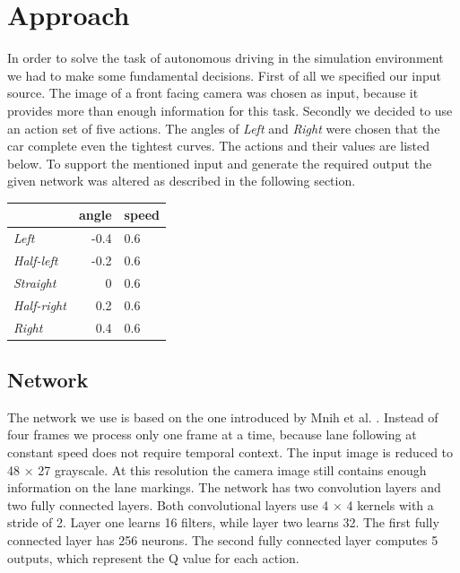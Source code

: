 
\section{Approach}\label{sec:approach}

In order to solve the task of autonomous driving in the simulation environment we had to make some fundamental decisions. First of all we specified our input source. The image of a front facing camera was chosen as input, because it provides more than enough information for this task. Secondly we decided to use an action set of five actions. The angles of \textit{Left} and \textit{Right} were chosen that the car complete even the tightest curves. The actions and their values are listed below. To support the mentioned input and generate the required output the given network was altered as described in the following section.
\begin{center}
	\begin{tabular}{ l | r | l }
							&	angle	& speed\\
		\hline
		\textit{Left} 		& 	-0.4 	& 0.6	\\
		\textit{Half-left} 	& 	-0.2 	& 0.6	\\
		\textit{Straight} 	& 	0 		& 0.6	\\
		\textit{Half-right} & 	0.2 	& 0.6	\\
		\textit{Right} 		& 	0.4 	& 0.6	\\
	\end{tabular}
	\label{actionset}
\end{center}

\subsection{Network}
The network we use is based on the one introduced by Mnih et al. \cite{Mnih13}. Instead of four frames we process only one frame at a time, because lane following at constant speed does not require temporal context. The input image is reduced to 48 $\times$ 27 grayscale. At this resolution the camera image still contains enough information on the lane markings. The network has two convolution layers and two fully connected layers. Both convolutional layers use 4 $\times$ 4 kernels with a stride of 2. Layer one learns 16 filters, while layer two learns 32. The first fully connected layer has 256 neurons. The second fully connected layer computes 5 outputs, which represent the Q value for each action.

